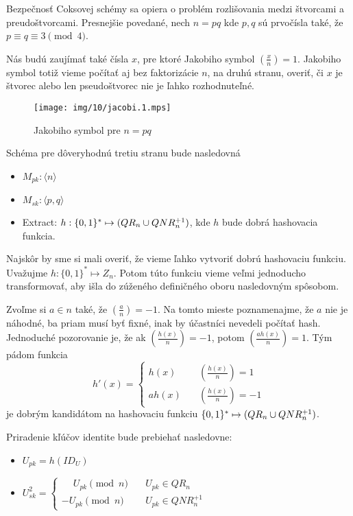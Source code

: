Bezpečnosť Coksovej schémy \cite{cocks} sa opiera o problém rozlišovania medzi
štvorcami a preudoštvorcami. Presnejšie povedané,
nech $n=pq$ kde $p,q$ sú prvočísla také, že $p \equiv q \equiv 3 \pmod{4}$.

\def\jacobi#1#2{\left( \frac{#1}{#2} \right)}

Nás budú zaujímať také čísla $x$, pre ktoré Jakobiho symbol
$\jacobi{x}{n} =1$. Jakobiho symbol totiž vieme počítať aj bez
faktorizácie $n$, na druhú stranu, overiť, či $x$ je štvorec alebo len
pseudoštvorec nie je ľahko rozhodnuteľné.

\begin{figure}[h]
    \centering
    \texttt{[image: img/10/jacobi.1.mps]}
    \caption{Jakobiho symbol pre $n=pq$}
    \label{fig:jacobi}
\end{figure}


Schéma pre dôveryhodnú tretiu stranu bude nasledovná
\begin{itemize}
    \item $M_{pk}: \langle n \rangle$
    \item $M_{sk}: \langle p,q \rangle$
    \item Extract: $h: \{0,1\}^* \mapsto (QR_n \cup QNR_n^{+1})$,
    kde $h$ bude dobrá hashovacia funkcia.
\end{itemize}

Najskôr by sme si mali overiť, že vieme ľahko vytvoriť dobrú
hashovaciu funkciu. Uvažujme $h:\{0,1\}^* \mapsto Z_n$.
Potom túto funkciu vieme veľmi jednoducho transformovať, aby išla do
zúženého definičného oboru nasledovným spôsobom.

Zvoľme si $a \in n$ také, že $\jacobi{a}{n} = -1$. Na tomto mieste
poznamenajme, že $a$ nie je náhodné, ba priam musí byť fixné, inak by
účastníci nevedeli počítať hash.
Jednoduché pozorovanie je, že ak $\jacobi{h(x)}{n}=-1$,
potom $\jacobi{a h(x)}{n}=1$.
Tým pádom funkcia
\begin{equation*}
h'(x) = \begin{cases}
            h(x)   \quad &\jacobi{h(x)}{n}=1 \\
            a h(x) \quad &\jacobi{h(x)}{n}=-1
        \end{cases}
\end{equation*}
je dobrým kandidátom na hashovaciu funkciu
$\{0,1\}^* \mapsto (QR_n \cup QNR_n^{+1})$.

Priradenie kľúčov identite bude prebiehať nasledovne:
\begin{itemize}
    \item $U_{pk}=h(ID_U)$

    \item $U_{sk}^2=\begin{cases}
            \phantom{-} U_{pk}\pmod{n}  \quad& U_{pk} \in QR_n \\
                     -  U_{pk}\pmod{n}  \quad& U_{pk} \in QNR_n^{+1}
                    \end{cases}$
\end{itemize}

